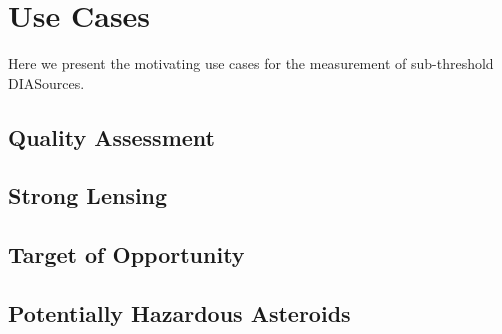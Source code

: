 \section{Use Cases}\label{sec:usecases}

Here we present the motivating use cases for the measurement of sub-threshold DIASources.

\subsection{Quality Assessment}\label{ssec:qa}

\subsection{Strong Lensing}\label{ssec:sl}

\subsection{Target of Opportunity}\label{ssec:too}

\subsection{Potentially Hazardous Asteroids}\label{ssec:pha}
